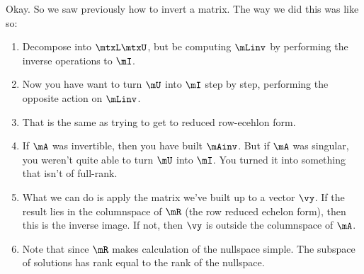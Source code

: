 Okay. So we saw previously how to invert a matrix. The way we did this
was like so:

\begin{enumerate}
  \item Decompose into $\mLU$, but be computing $\mLinv$ by performing
  the inverse operations to $\mI$.

  \item Now you have want to turn $\mU$ into $\mI$ step by step,
  performing the opposite action on $\mLinv$.

  \item That is the same as trying to get to reduced row-ecehlon form.

  \item If $\mA$ was invertible, then you have built $\mAinv$. But if
  $\mA$ was singular, you weren't quite able to turn $\mU$ into $\mI$.
  You turned it into something that isn't of full-rank.

  \item What we can do is apply the matrix we've built up to a vector
  $\vy$. If the result lies in the columnspace of $\mR$ (the row reduced
  echelon form), then this is the inverse image. If not, then $\vy$ is
  outside the columnspace of $\mA$.

  \item Note that since $\mR$ makes calculation of the nullspace simple.
  The subspace of solutions has rank equal to the rank of the nullspace.
\end{enumerate}
